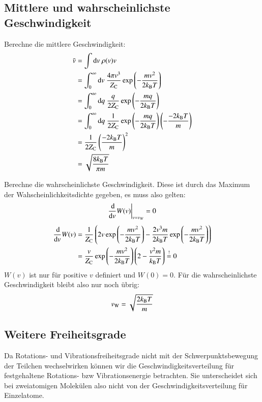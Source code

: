 \subsection{Mittlere und wahrscheinlichste Geschwindigkeit}
Berechne die mittlere Geschwindigkeit:
\begin{align*}
\bar{v} &= \int \dif v \ \rho(v) v \\
&= \int_0^\infty \dif v \ \frac{4\pi v^3}{Z_\text C} \exp\del{-\frac{mv^2}{2k_\text B T}} \\
&= \int_0^\infty \dif q \ \frac{q}{2Z_\text C} \exp\del{-\frac{mq}{2k_\text B T}} \\
&= \int_0^\infty \dif q \ \frac{1}{2Z_\text C} \exp\del{-\frac{mq}{2k_\text B T}}\del{-\frac{-2k_\text B T}{m}} \\
&= \frac{1}{2Z_\text C}\del{\frac{-2k_\text B T}{m}}^2 \\
&= \sqrt{\frac{8k_\text B T}{\pi m}}
\end{align*}

Berechne die wahrscheinlichste Geschwindigkeit. Diese ist durch das Maximum der Wahscheinlichkeitsdichte gegeben, es muss also gelten:
\[\frac{\dif}{\dif v}W(v)\bigg|_{v=v_W}=0\]
\begin{align*}
\frac{\dif}{\dif v}W(v) &= \frac{1}{Z_\text C}\del{2v\exp\del{-\frac{mv^2}{2k_\text BT}}-\frac{2v^3m}{2k_\text BT}\exp\del{-\frac{mv^2}{2k_\text BT}}} \\
&= \frac{v}{Z_\text C}\exp\del{-\frac{mv^2}{2k_\text BT}} \del{2-\frac{v^2m}{k_\text B T}} \stackrel{!}{=} 0 \\
\end{align*}
$W(v)$ ist nur für positive $v$ definiert und $W(0)=0$. Für die wahrscheinlichste Geschwindigkeit bleibt also nur noch übrig:
\[v_\text W=\sqrt{\frac{2k_\text BT}{m}}\]

\subsection{Weitere Freiheitsgrade}
Da Rotations- und Vibrationsfreiheitsgrade nicht mit der Schwerpunktsbewegung der Teilchen wechselwirken können wir die Geschwindigkeitsverteilung für festgehaltene Rotations- bzw Vibrationsenergie betrachten. Sie unterscheidet sich bei zweiatomigen Molekülen also nicht von der Geschwindigkeitsverteilung für Einzelatome.

\IfFileExists{\bibliographyfile}{
    \printbibliography
}{}



